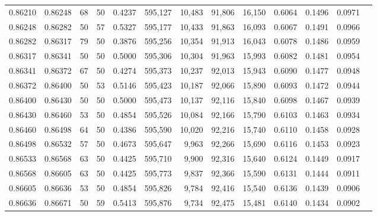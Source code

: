 \begin{tabular}{rrrrrrrrrrrrr}
0.86210 & 0.86248 &    68 &  50 &                                     0.4237 & 595,127 &  10,483 &  91,806 &  16,150 & 0.6064 & 0.1496 & 0.0971 \\
0.86248 & 0.86282 &    50 &  57 &                                     0.5327 & 595,177 &  10,433 &  91,863 &  16,093 & 0.6067 & 0.1491 & 0.0966 \\
0.86282 & 0.86317 &    79 &  50 &                                     0.3876 & 595,256 &  10,354 &  91,913 &  16,043 & 0.6078 & 0.1486 & 0.0959 \\
0.86317 & 0.86341 &    50 &  50 &                                     0.5000 & 595,306 &  10,304 &  91,963 &  15,993 & 0.6082 & 0.1481 & 0.0954 \\
0.86341 & 0.86372 &    67 &  50 &                                     0.4274 & 595,373 &  10,237 &  92,013 &  15,943 & 0.6090 & 0.1477 & 0.0948 \\
0.86372 & 0.86400 &    50 &  53 &                                     0.5146 & 595,423 &  10,187 &  92,066 &  15,890 & 0.6093 & 0.1472 & 0.0944 \\
0.86400 & 0.86430 &    50 &  50 &                                     0.5000 & 595,473 &  10,137 &  92,116 &  15,840 & 0.6098 & 0.1467 & 0.0939 \\
0.86430 & 0.86460 &    53 &  50 &                                     0.4854 & 595,526 &  10,084 &  92,166 &  15,790 & 0.6103 & 0.1463 & 0.0934 \\
0.86460 & 0.86498 &    64 &  50 &                                     0.4386 & 595,590 &  10,020 &  92,216 &  15,740 & 0.6110 & 0.1458 & 0.0928 \\
0.86498 & 0.86532 &    57 &  50 &                                     0.4673 & 595,647 &   9,963 &  92,266 &  15,690 & 0.6116 & 0.1453 & 0.0923 \\
0.86533 & 0.86568 &    63 &  50 &                                     0.4425 & 595,710 &   9,900 &  92,316 &  15,640 & 0.6124 & 0.1449 & 0.0917 \\
0.86568 & 0.86605 &    63 &  50 &                                     0.4425 & 595,773 &   9,837 &  92,366 &  15,590 & 0.6131 & 0.1444 & 0.0911 \\
0.86605 & 0.86636 &    53 &  50 &                                     0.4854 & 595,826 &   9,784 &  92,416 &  15,540 & 0.6136 & 0.1439 & 0.0906 \\
0.86636 & 0.86671 &    50 &  59 &                                     0.5413 & 595,876 &   9,734 &  92,475 &  15,481 & 0.6140 & 0.1434 & 0.0902 \\

\end{tabular}
